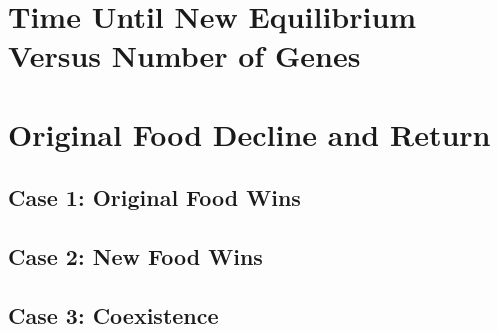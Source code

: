\documentclass[11pt]{article}
\begin{document}
\section*{Time Until New Equilibrium Versus Number of Genes}

\section*{Original Food Decline and Return}

\subsection*{Case 1: Original Food Wins}

\subsection*{Case 2: New Food Wins}

\subsection*{Case 3: Coexistence}
\end{document}
